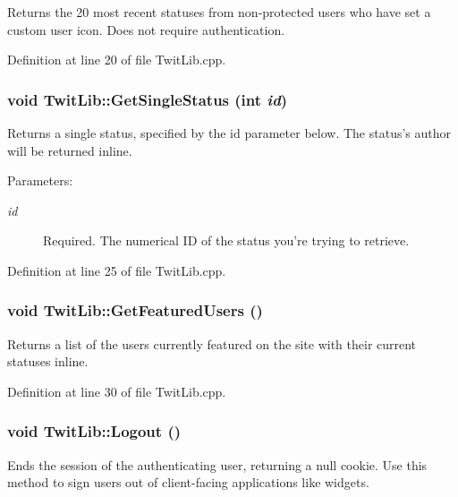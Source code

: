 Returns the 20 most recent statuses from non-protected users who have set a custom user icon. Does not require authentication. 

Definition at line 20 of file TwitLib.cpp.\hypertarget{classTwitLib_aecdd7da5a39a8687056c3da36889f55}{
\subsubsection{\setlength{\rightskip}{0pt plus 5cm}void TwitLib::GetSingleStatus (int {\em id})}}
\label{classTwitLib_aecdd7da5a39a8687056c3da36889f55}


Returns a single status, specified by the id parameter below. The status's author will be returned inline. \begin{Desc}
\item[Parameters:]
\begin{description}
\item[{\em id}]Required. The numerical ID of the status you're trying to retrieve. \end{description}
\end{Desc}


Definition at line 25 of file TwitLib.cpp.\hypertarget{classTwitLib_76cd55d78f2b060a9e7643a2d549f6ce}{
\subsubsection{\setlength{\rightskip}{0pt plus 5cm}void TwitLib::GetFeaturedUsers ()}}
\label{classTwitLib_76cd55d78f2b060a9e7643a2d549f6ce}


Returns a list of the users currently featured on the site with their current statuses inline. 

Definition at line 30 of file TwitLib.cpp.\hypertarget{classTwitLib_f302e755368a303331d8f6f2d84c9770}{
\subsubsection{\setlength{\rightskip}{0pt plus 5cm}void TwitLib::Logout ()}}
\label{classTwitLib_f302e755368a303331d8f6f2d84c9770}


Ends the session of the authenticating user, returning a null cookie. Use this method to sign users out of client-facing applications like widgets. 

